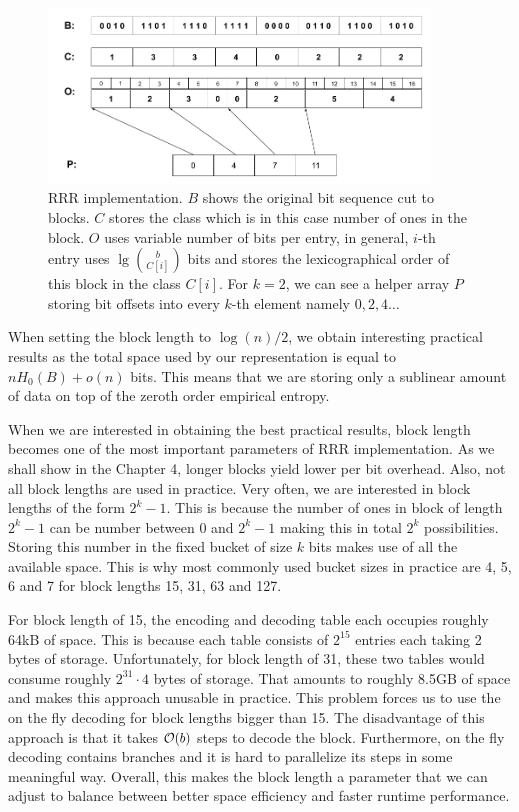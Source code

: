 \begin{figure}
	\centerline{
		\includegraphics[width=0.9\textwidth, height=0.3\textheight]{images/rrr}
	}
	\caption[TODO]{RRR implementation. $B$ shows the original bit sequence cut to
    blocks. $C$ stores the class which is in this case number of ones in the block.
    $O$ uses variable number of bits per entry, in general, $i$-th entry uses
    $\lg {b\choose C[i]}$ bits and stores the lexicographical order
    of this block in the class $C[i]$. For $k=2$, we can see a helper array $P$
    storing bit offsets into every $k$-th element namely $0, 2, 4\ldots$
	}
	\label{obr:RRRFinal}
\end{figure}

When setting the block length to $\log(n)/2$, we obtain interesting practical results as
the total space used by our representation is equal to $nH_0(B) + o(n)$ bits. This means
that we are storing only a sublinear amount of data on top of the zeroth order empirical entropy.

When we are interested in obtaining the best practical results, block length becomes
one of the most important parameters of RRR implementation. As we shall show in the Chapter
4, longer blocks yield lower per bit overhead. Also, not all block
lengths are used in practice. Very often, we are interested in block lengths of the form $2^k-1$.
This is because the number of ones in block of length $2^k-1$ can be number between 0 and $2^k-1$
making this in total $2^k$ possibilities. Storing this number in the fixed bucket of size
$k$ bits makes use of all the available space. This is why most commonly used bucket sizes in
practice are 4, 5, 6 and 7 for block lengths 15, 31, 63 and 127.

For block length of 15, the encoding and decoding table each occupies roughly 64kB of space. This
is because each table consists of $2^{15}$ entries each taking 2 bytes of storage. Unfortunately,
for block length of 31, these two tables would consume roughly $2^{31}\cdot 4$ bytes of storage. That
amounts to roughly 8.5GB of space and makes this approach unusable in practice. This problem forces us
to use the on the fly decoding for block lengths bigger than 15. The disadvantage of this approach is
that it takes $\mathcal{O}(b)$ steps to decode the block. Furthermore, on the fly decoding contains branches
and it is hard to parallelize its steps in some meaningful way. Overall, this makes the block length a
parameter that we can adjust to balance between better space efficiency and faster runtime performance.